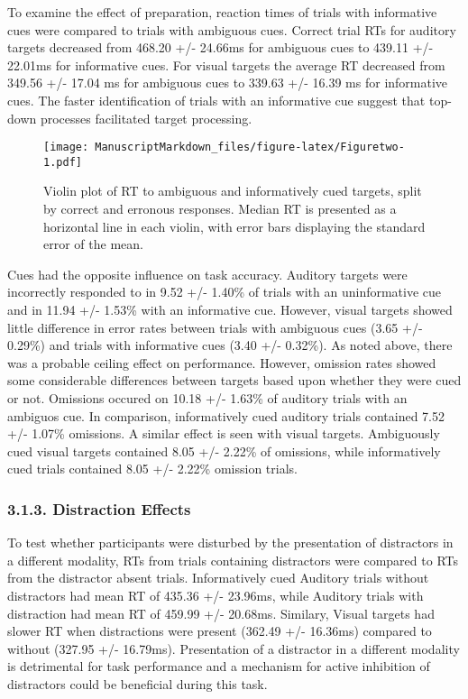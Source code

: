 \documentclass[
  english,
  ,man,floatsintext]{apa6}
\begin{document}
To examine the effect of preparation, reaction times of trials with informative cues were compared to trials with ambiguous cues. Correct trial RTs for auditory targets decreased from 468.20 +/- 24.66ms for ambiguous cues to 439.11 +/- 22.01ms for informative cues. For visual targets the average RT decreased from 349.56 +/- 17.04 ms for ambiguous cues to 339.63 +/- 16.39 ms for informative cues. The faster identification of trials with an informative cue suggest that top-down processes facilitated target processing.

\begin{figure}
\centering
\texttt{[image: ManuscriptMarkdown\_files/figure-latex/Figuretwo-1.pdf]}
\caption{\label{fig:Figuretwo}Violin plot of RT to ambiguous and informatively cued targets, split by correct and erronous responses. Median RT is presented as a horizontal line in each violin, with error bars displaying the standard error of the mean.}
\end{figure}

Cues had the opposite influence on task accuracy. Auditory targets were incorrectly responded to in 9.52 +/- 1.40\% of trials with an uninformative cue and in 11.94 +/- 1.53\% with an informative cue. However, visual targets showed little difference in error rates between trials with ambiguous cues (3.65 +/- 0.29\%) and trials with informative cues (3.40 +/- 0.32\%). As noted above, there was a probable ceiling effect on performance. However, omission rates showed some considerable differences between targets based upon whether they were cued or not. Omissions occured on 10.18 +/- 1.63\% of auditory trials with an ambiguos cue. In comparison, informatively cued auditory trials contained 7.52 +/- 1.07\% omissions. A similar effect is seen with visual targets. Ambiguously cued visual targets contained 8.05 +/- 2.22\% of omissions, while informatively cued trials contained 8.05 +/- 2.22\% omission trials.

\hypertarget{distraction-effects}{%
\subsubsection{3.1.3. Distraction Effects}\label{distraction-effects}}

To test whether participants were disturbed by the presentation of distractors in a different modality, RTs from trials containing distractors were compared to RTs from the distractor absent trials. Informatively cued Auditory trials without distractors had mean RT of 435.36 +/- 23.96ms, while Auditory trials with distraction had mean RT of 459.99 +/- 20.68ms. Similary, Visual targets had slower RT when distractions were present (362.49 +/- 16.36ms) compared to without (327.95 +/- 16.79ms). Presentation of a distractor in a different modality is detrimental for task performance and a mechanism for active inhibition of distractors could be beneficial during this task.
\end{document}
